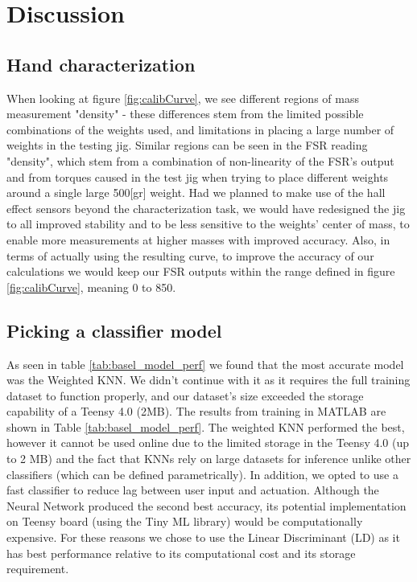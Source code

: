 \documentclass[10pt]{article}
\begin{document}
\section{Discussion}
\subsection{Hand characterization}
 When looking at figure \ref{fig:calibCurve}, we see different regions of mass measurement "density" - these differences stem from the limited possible combinations of the weights used, and limitations in placing a large number of weights in the testing jig. Similar regions can be seen in the FSR reading "density", which stem from a combination of non-linearity of the FSR's output and from torques caused in the test jig when trying to place different weights around a single large 500[gr] weight. Had we planned to make use of the hall effect sensors beyond the characterization task, we would have redesigned the jig to all improved stability and to be less sensitive to the weights' center of mass, to enable more measurements at higher masses with improved accuracy. Also, in terms of actually using the resulting curve, to improve the accuracy of our calculations we would keep our FSR outputs within the range defined in figure \ref{fig:calibCurve}, meaning 0 to 850.

\subsection{Picking a classifier model}
As seen in table \ref{tab:basel_model_perf} we found that the most accurate model was the Weighted KNN. We didn't continue with it as it requires the full training dataset to function properly, and our dataset's size exceeded the storage capability of a Teensy 4.0 (2MB). The results from training in MATLAB are shown in Table \ref{tab:basel_model_perf}. The weighted KNN performed the best, however it cannot be used online due to the limited storage in the Teensy 4.0 (up to 2 MB) and the fact that KNNs rely on large datasets for inference unlike other classifiers (which can be defined parametrically). In addition, we opted to use a fast classifier to reduce lag between user input and actuation. Although the Neural Network produced the second best accuracy, its potential implementation on Teensy board (using the Tiny ML library) would be computationally expensive. For these reasons we chose to use the Linear Discriminant (LD) as it has best performance relative to its computational cost and its storage requirement.
\end{document}
